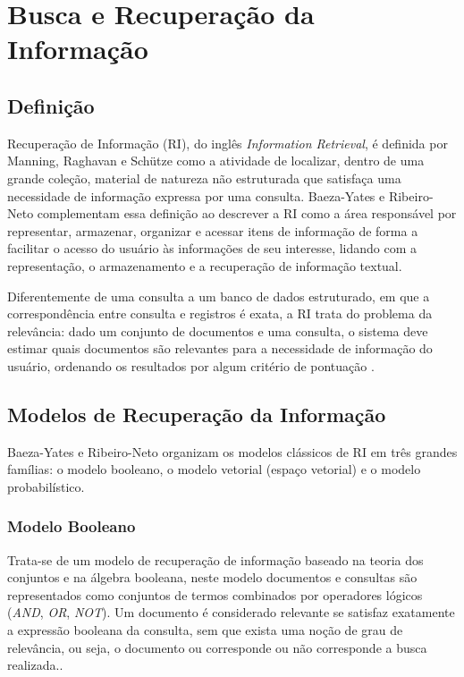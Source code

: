\section{Busca e Recuperação da Informação}\label{sec:busca-recuperacao-informacao}

\subsection{Definição}

Recuperação de Informação (RI), do inglês \textit{Information Retrieval}, é definida por Manning, Raghavan e Schütze \cite{manning2008ir} como a atividade de localizar, dentro de uma grande coleção, material de natureza não estruturada que satisfaça uma necessidade de informação expressa por uma consulta. Baeza-Yates e Ribeiro-Neto \cite{baezayates2010modern} complementam essa definição ao descrever a RI como a área responsável por representar, armazenar, organizar e acessar itens de informação de forma a facilitar o acesso do usuário às informações de seu interesse, lidando com a representação, o armazenamento e a recuperação de informação textual.

Diferentemente de uma consulta a um banco de dados estruturado, em que a correspondência entre consulta e registros é exata, a RI trata do problema da relevância: dado um conjunto de documentos e uma consulta, o sistema deve estimar quais documentos são relevantes para a necessidade de informação do usuário, ordenando os resultados por algum critério de pontuação \cite{manning2008ir}.

\subsection{Modelos de Recuperação da Informação}

Baeza-Yates e Ribeiro-Neto \cite{baezayates2010modern} organizam os modelos clássicos de RI em três grandes famílias: o modelo booleano, o modelo vetorial (espaço vetorial) e o modelo probabilístico.

\subsubsection{Modelo Booleano}
Trata-se de um modelo de recuperação de informação baseado na teoria dos conjuntos e na álgebra booleana, neste modelo documentos e consultas são representados como conjuntos de termos combinados por operadores lógicos (\textit{AND}, \textit{OR}, \textit{NOT}). Um documento é considerado relevante se satisfaz exatamente a expressão booleana da consulta, sem que exista uma noção de grau de relevância, ou seja, o documento ou corresponde ou não corresponde a busca realizada.\cite{baezayates2010modern}.

